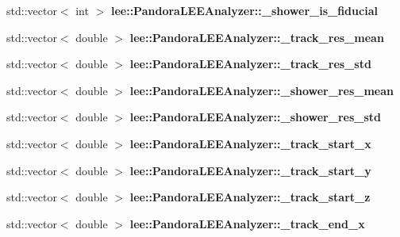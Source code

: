 \begin{DoxyCompactItemize}
\item 
\hypertarget{group__lee_ga97495f8c6c496aefe56f07f06a5a55ce}{std\-::vector$<$ int $>$ {\bfseries lee\-::\-Pandora\-L\-E\-E\-Analyzer\-::\-\_\-shower\-\_\-is\-\_\-fiducial}}\label{group__lee_ga97495f8c6c496aefe56f07f06a5a55ce}

\item 
\hypertarget{group__lee_gac8415acd9fe624379b1af65fe523a613}{std\-::vector$<$ double $>$ {\bfseries lee\-::\-Pandora\-L\-E\-E\-Analyzer\-::\-\_\-track\-\_\-res\-\_\-mean}}\label{group__lee_gac8415acd9fe624379b1af65fe523a613}

\item 
\hypertarget{group__lee_gacb00c39c2b71bd7fac4a3c7c6733d514}{std\-::vector$<$ double $>$ {\bfseries lee\-::\-Pandora\-L\-E\-E\-Analyzer\-::\-\_\-track\-\_\-res\-\_\-std}}\label{group__lee_gacb00c39c2b71bd7fac4a3c7c6733d514}

\item 
\hypertarget{group__lee_ga9992152dfa9af10448ef0751007d0c3a}{std\-::vector$<$ double $>$ {\bfseries lee\-::\-Pandora\-L\-E\-E\-Analyzer\-::\-\_\-shower\-\_\-res\-\_\-mean}}\label{group__lee_ga9992152dfa9af10448ef0751007d0c3a}

\item 
\hypertarget{group__lee_ga3a0c057fc83d09918ac2aa805d5bf3c7}{std\-::vector$<$ double $>$ {\bfseries lee\-::\-Pandora\-L\-E\-E\-Analyzer\-::\-\_\-shower\-\_\-res\-\_\-std}}\label{group__lee_ga3a0c057fc83d09918ac2aa805d5bf3c7}

\item 
\hypertarget{group__lee_ga1a0667bd934f598a41bb776e028270f4}{std\-::vector$<$ double $>$ {\bfseries lee\-::\-Pandora\-L\-E\-E\-Analyzer\-::\-\_\-track\-\_\-start\-\_\-x}}\label{group__lee_ga1a0667bd934f598a41bb776e028270f4}

\item 
\hypertarget{group__lee_ga55a26b4d446ea4597e44b2fc22de4cc6}{std\-::vector$<$ double $>$ {\bfseries lee\-::\-Pandora\-L\-E\-E\-Analyzer\-::\-\_\-track\-\_\-start\-\_\-y}}\label{group__lee_ga55a26b4d446ea4597e44b2fc22de4cc6}

\item 
\hypertarget{group__lee_ga71d7b5e5347441a36d0a33710d6c4483}{std\-::vector$<$ double $>$ {\bfseries lee\-::\-Pandora\-L\-E\-E\-Analyzer\-::\-\_\-track\-\_\-start\-\_\-z}}\label{group__lee_ga71d7b5e5347441a36d0a33710d6c4483}

\item 
\hypertarget{group__lee_ga78cb36dded5326c08cae77d5af6f3cd2}{std\-::vector$<$ double $>$ {\bfseries lee\-::\-Pandora\-L\-E\-E\-Analyzer\-::\-\_\-track\-\_\-end\-\_\-x}}\label{group__lee_ga78cb36dded5326c08cae77d5af6f3cd2}


\end{DoxyCompactItemize}
